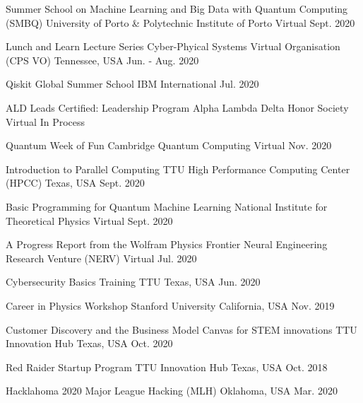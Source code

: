 

\begin{cvhonors}

    \cvhonor
    {Summer School on Machine Learning and Big Data with Quantum Computing (SMBQ)}
    {University of Porto \& Polytechnic Institute of Porto}
    {Virtual}
    {Sept. 2020}

    \cvhonor
    {Lunch and Learn Lecture Series}
    {Cyber-Phyical Systems Virtual Organisation (CPS VO) }
    {Tennessee, USA}
    {Jun. - Aug. 2020}

    \cvhonor
    {Qiskit Global Summer School}
    {IBM}
    {International}
    {Jul. 2020}

\end{cvhonors}


\begin{cvhonors}

    \cvhonor
    {ALD Leads Certified: Leadership Program}
    {Alpha Lambda Delta Honor Society}
    {Virtual}
    {In Process}

    \cvhonor
    {Quantum Week of Fun}
    {Cambridge Quantum Computing}
    {Virtual}
    {Nov. 2020}

    \cvhonor
    {Introduction to Parallel Computing}
    {TTU High Performance Computing Center (HPCC)}
    {Texas, USA}
    {Sept. 2020}


    \cvhonor
    {Basic Programming for Quantum Machine Learning}
    {National Institute for Theoretical Physics}
    {Virtual}
    {Sept. 2020}

    \cvhonor
    {A Progress Report from the Wolfram Physics Frontier}
    {Neural Engineering Research Venture (NERV)}
    {}
    {Virtual}
    {Jul. 2020}

    \cvhonor
    {Cybersecurity Basics Training}
    {TTU}
    {Texas, USA}
    {Jun. 2020}

    \cvhonor
    {Career in Physics Workshop}
    {Stanford University}
    {California, USA}
    {Nov. 2019}

    \cvhonor
    {Customer Discovery and the Business Model Canvas for STEM innovations}
    {TTU Innovation Hub}
    {Texas, USA}
    {Oct. 2020}

    \cvhonor
    {Red Raider Startup Program}
    {TTU Innovation Hub}
    {Texas, USA}
    {Oct. 2018}

\end{cvhonors}



\begin{cvhonors}
    \cvhonor
    {Hacklahoma 2020}
    {Major League Hacking (MLH)}
    {Oklahoma, USA}
    {Mar. 2020}

\end{cvhonors}
